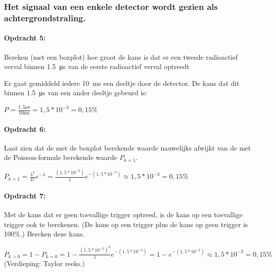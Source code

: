 \subsubsection{Het signaal van een enkele detector wordt gezien als achtergrondstraling.}

\begin{minipage}[t]{1\columnwidth}%

\paragraph{Opdracht 5:}

Bereken (met een boxplot) hoe groot de kans is dat er een
tweede radioactief verval binnen \SI{1.5}{\micro\second} van de eerste
radioactief verval optreedt

\bigskip{}

Er gaat gemiddeld iedere \SI{10}{\milli\second} een deeltje door
de detector. De kans dat dit binnen \SI{1.5}{\micro\second} van een
ander deeltje gebeurd is:

\bigskip{}

$P=\frac{1,5\mu\mathrm{s}}{10\mathrm{ms}}=1,5*10^{-3}=0,15\%$%
\end{minipage}

\bigskip{}

\begin{minipage}[t]{1\columnwidth}%

\paragraph{Opdracht 6:}

Laat zien dat de met de boxplot berekende waarde nauwelijks
afwijkt van de met de Poisson-formule berekende waarde $P_{k=1}$.

\bigskip{}

$P_{k=1}=\frac{\lambda^{k}}{k!}e^{-\lambda}=\frac{\left(1,5*10^{-3}\right)}{1}e^{-\left(1,5*10^{-3}\right)}\approx1,5*10^{-3}=0,15\%$%
\end{minipage}

\bigskip{}

\begin{minipage}[t]{1\columnwidth}%

\paragraph{Opdracht 7:}

Met de kans dat er geen toevallige trigger optreed, is de
kans op een toevallige trigger ook te berekenen. (De kans op een trigger
plus de kans op geen trigger is 100\%.) Bereken deze kans.

\bigskip{}

$P_{k>0}=1-P_{k=0}=1-\frac{\left(1,5*10^{-3}\right)^{0}}{1}e^{-\left(1,5*10^{-3}\right)}=1-e^{-\left(1,5*10^{-3}\right)}\approx1,5*10^{-3}=0,15\%$
(Verdieping: Taylor reeks.)%
\end{minipage}

